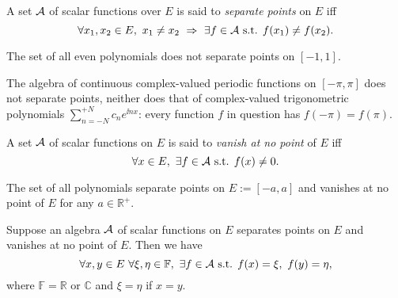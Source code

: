 \begin{defn}
  \label{def:separatePoints}
  A set ${\cal A}$ of scalar functions over $E$
  is said to \emph{separate points} on $E$
  iff
  \begin{displaymath}
    \forall x_1,x_2\in E,\
    x_1\ne x_2\ \Rightarrow\
    \exists f\in{\cal A} \text{ s.t. }
    f(x_1)\ne f(x_2).
  \end{displaymath}
\end{defn}

\begin{exm}
  The set of all even polynomials 
  does not separate points on $[-1,1]$. 
\end{exm}

\begin{exm}
  \label{exm:complexTrigPolysNotSeparable}
  The algebra of continuous complex-valued
  periodic functions on $[-\pi, \pi]$
  does not separate points, 
  neither does that of complex-valued
  trigonometric polynomials
  $\sum_{n=-N}^{+N} c_n e^{\ii nx}$:
  every function $f$ in question has
  $f(-\pi) = f(\pi)$. 
\end{exm}

\begin{defn}
  \label{def:vanishAtNoPoints}
  A set ${\cal A}$ of scalar functions on $E$
  is said to \emph{vanish at no point} of $E$ iff
  \begin{displaymath}
    \forall x\in E,\
    \exists f\in{\cal A} \text{ s.t. }
    f(x)\ne 0. 
  \end{displaymath}
\end{defn}

\begin{exm}
  The set of all polynomials %
  separate points on $E:=[-a,a]$
  and vanishes at no point of $E$ for any $a\in\mathbb{R}^+$.  
\end{exm}

\begin{lem}
  \label{lem:twoValsOfFuncAlgebra}
  Suppose an algebra ${\cal A}$ of scalar functions on $E$
  separates points on $E$ and vanishes at no point of $E$.
  Then we have
  \begin{displaymath}
    \forall x, y\in E\ %
    \forall \xi, \eta \in \mathbb{F},\
    \exists f\in {\cal A} \text{ s.t. }
    f(x)=\xi,\ f(y)=\eta, 
  \end{displaymath}
  where $\mathbb{F}=\mathbb{R}$ or $\mathbb{C}$
  and $\xi=\eta$ if $x=y$. 
\end{lem}


